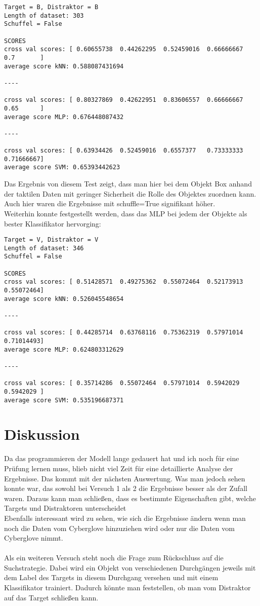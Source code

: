 \documentclass[]{report}
\begin{document}
\begin{lstlisting}
Target = B, Distraktor = B
Length of dataset: 303
Schuffel = False

SCORES
cross val scores: [ 0.60655738  0.44262295  0.52459016  0.66666667  0.7       ]
average score kNN: 0.588087431694

----

cross val scores: [ 0.80327869  0.42622951  0.83606557  0.66666667  0.65      ]
average score MLP: 0.676448087432

----

cross val scores: [ 0.63934426  0.52459016  0.6557377   0.73333333  0.71666667]
average score SVM: 0.65393442623
\end{lstlisting}
Das Ergebnis von diesem Test zeigt, dass man hier bei dem Objekt Box anhand der taktilen Daten mit geringer Sicherheit die Rolle des Objektes zuordnen kann. Auch hier waren die Ergebnisse mit schuffle=True signifikant höher.\\
Weiterhin konnte festgestellt werden, dass das MLP bei jedem der Objekte als bester Klassifikator hervorging:
\begin{lstlisting}
Target = V, Distraktor = V
Length of dataset: 346
Schuffel = False

SCORES
cross val scores: [ 0.51428571  0.49275362  0.55072464  0.52173913  0.55072464]
average score kNN: 0.526045548654

----

cross val scores: [ 0.44285714  0.63768116  0.75362319  0.57971014  0.71014493]
average score MLP: 0.624803312629

----

cross val scores: [ 0.35714286  0.55072464  0.57971014  0.5942029   0.5942029 ]
average score SVM: 0.535196687371
\end{lstlisting}

\section*{Diskussion}
Da das programmieren der Modell lange gedauert hat und ich noch für eine Prüfung lernen muss, blieb nicht viel Zeit für eine detaillierte Analyse der Ergebnisse.
Das kommt mit der nächsten Auswertung. Was man jedoch sehen konnte war, das sowohl bei Versuch 1 als 2 die Ergebnisse besser als der Zufall waren. Daraus kann man schließen, dass es bestimmte Eigenschaften gibt, welche Targets und Distraktoren unterscheidet\\
Ebenfalls interessant wird zu sehen, wie sich die Ergebnisse ändern wenn man noch die Daten vom Cyberglove hinzuziehen wird oder nur die Daten vom Cyberglove nimmt.\\
\\
Als ein weiteren Versuch steht noch die Frage zum Rückschluss auf die Suchstrategie. Dabei wird ein Objekt von verschiedenen Durchgängen jeweils mit dem Label des Targets in diesem Durchgang versehen und mit einem Klassifikator trainiert. Dadurch könnte man feststellen, ob man vom Distraktor auf das Target schließen kann.
\end{document}

